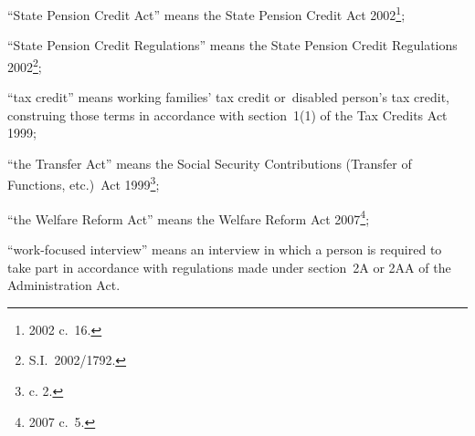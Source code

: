 \documentclass[12pt,a4paper]{article}
\begin{document}
\begin{enumerate}
“State Pension Credit Act” means the State Pension Credit Act 2002\footnote{2002 c.~16.};

“State Pension Credit Regulations” means the State Pension Credit Regulations 2002\footnote{S.I.~2002/1792.};

“tax credit” means working families' tax credit or~disabled person’s tax credit, construing those terms in accordance with section~1(1) of the Tax Credits Act 1999;

“the Transfer Act” means the Social Security Contributions (Transfer of Functions, etc.)\ Act 1999\footnote{ c. 2.};


“the Welfare Reform Act” means the Welfare Reform Act 2007\footnote{2007 c.~5.};



“work-focused interview” means an interview in which a person is required to take part in accordance with regulations made under section~2A or 2AA of the Administration Act.

\end{enumerate}
\end{document}
